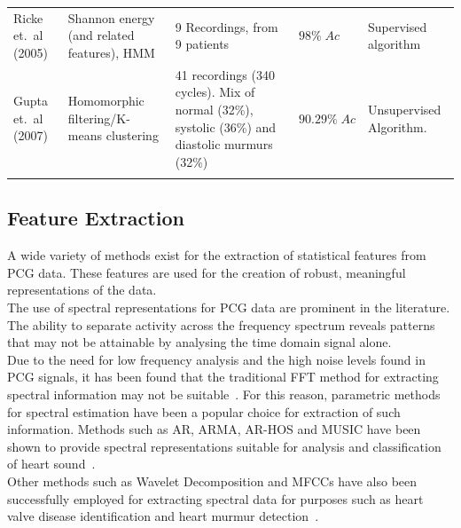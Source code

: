 \documentclass[titlepage, 12pt]{scrartcl} \usepackage{enumitem}
\newcommand{\dbottomrule}{\specialrule{1pt}{0pt}{1.4pt}%
            \specialrule{1pt}{0pt}{\belowrulesep}%
            }
\begin{document}
\begin{landscape}
\begin{table}[htbp]
\begin{tabulary}{\linewidth}{LLLLL}
Ricke et.\ al (2005)    & Shannon energy (and related features), HMM                                                     & 9 Recordings, from 9 patients                                                                  & $98\%\;Ac$                 & Supervised algorithm                                                                             \\
Gupta et.\ al (2007)    & Homomorphic filtering/K-means clustering                                                       & 41 recordings (340 cycles). Mix of normal (32\%), systolic (36\%) and diastolic murmurs (32\%) & $90.29\%\;Ac$              & Unsupervised Algorithm.                                                                          \\ \bottomrule
\dbottomrule\\
\end{tabulary}
\end{table}
\end{landscape}
\restoregeometry

\subsection{Feature Extraction}
A wide variety of methods exist for the extraction of statistical
features from PCG data. These features are used for the creation of
robust, meaningful representations of the data.\\
The use of spectral representations for PCG data are prominent in the
literature. The ability to separate activity across the frequency
spectrum reveals patterns that may not be attainable by analysing the
time domain signal alone.\\
Due to the need for low frequency analysis and the high noise levels
found in PCG signals, it has been found that the traditional FFT
method for extracting spectral information may not be
suitable~\parencite{Akay1990}. For this reason, parametric methods for
spectral estimation have been a popular choice for extraction of such information.
Methods such as AR, ARMA, AR-HOS and MUSIC have been shown to provide spectral
representations suitable for analysis and classification of heart
sound~\parencite{Ergen2001, Schmidt2015}.\\
Other methods such as Wavelet Decomposition and MFCCs have also been
successfully  employed for extracting spectral data for purposes such
as heart valve disease identification and heart murmur
detection~\parencite{Quiceno-Manrique2010a, Maglogiannis2009}.\\
\end{document}
